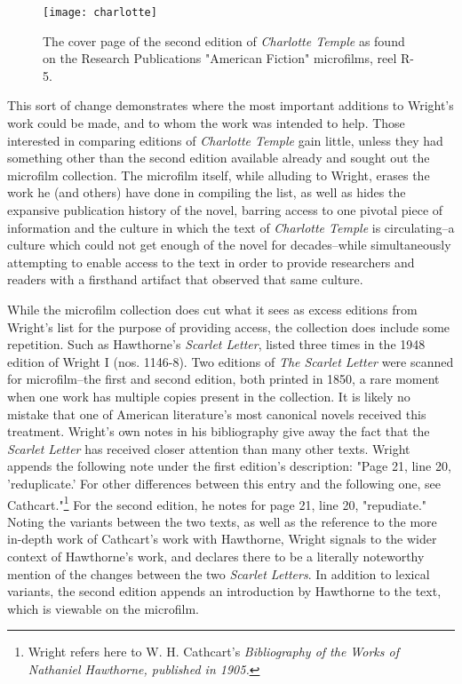 \begin{figure}
\texttt{[image: charlotte]}
\caption{The cover page of the second edition of \textit{Charlotte Temple} as found on the Research Publications "American Fiction" microfilms, reel R-5.}
\end{figure}

This sort of change demonstrates where the most important additions to Wright's work could be made, and to whom the work was intended to help. Those interested in comparing editions of \textit{Charlotte Temple} gain little, unless they had something other than the second edition available already and sought out the microfilm collection. The microfilm itself, while alluding to Wright, erases the work he (and others) have done in compiling the list, as well as hides the expansive publication history of the novel, barring access to one pivotal piece of information and the culture in which the text of \textit{Charlotte Temple} is circulating--a culture which could not get enough of the novel for decades--while simultaneously attempting to enable access to the text in order to provide researchers and readers with a firsthand artifact that observed that same culture.

While the microfilm collection does cut what it sees as excess editions from Wright's list for the purpose of providing access, the collection does include some repetition. Such as Hawthorne's \textit{Scarlet Letter}, listed three times in the 1948 edition of Wright I (nos. 1146-8). Two editions of \textit{The Scarlet Letter} were scanned for microfilm--the first and second edition, both printed in 1850, a rare moment when one work has multiple copies present in the collection. It is likely no mistake that one of American literature's most canonical novels received this treatment. Wright's own notes in his bibliography give away the fact that the \textit{Scarlet Letter} has received closer attention than many other texts. Wright appends the following note under the first edition's description: "Page 21, line 20, 'reduplicate.' For other differences between this entry and the following one, see Cathcart."\footnote{Wright refers here to W. H. Cathcart's \textit{Bibliography of the Works of Nathaniel Hawthorne, published in 1905.}} For the second edition, he notes for page 21, line 20, "repudiate."\autocite[122]{wright_american_1948} Noting the variants between the two texts, as well as the reference to the more in-depth work of Cathcart's work with Hawthorne, Wright signals to the wider context of Hawthorne's work, and declares there to be a literally noteworthy mention of the changes between the two \textit{Scarlet Letters}. In addition to lexical variants, the second edition appends an introduction by Hawthorne to the text, which is viewable on the microfilm. 

